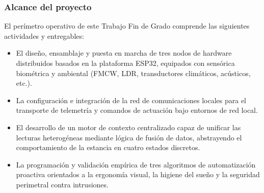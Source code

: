 \subsubsection{Alcance del proyecto}
El perímetro operativo de este Trabajo Fin de Grado comprende las siguientes actividades y entregables:
\begin{itemize}
    \item El diseño, ensamblaje y puesta en marcha de tres nodos de hardware distribuidos basados en la plataforma ESP32, equipados con sensórica biométrica y ambiental (FMCW, LDR, transductores climáticos, acústicos, etc.).
    \item La configuración e integración de la red de comunicaciones locales para el transporte de telemetría y comandos de actuación bajo entornos de red local.
    \item El desarrollo de un motor de contexto centralizado capaz de unificar las lecturas heterogéneas mediante lógica de fusión de datos, abstrayendo el comportamiento de la estancia en cuatro estados discretos.
    \item La programación y validación empírica de tres algoritmos de automatización proactiva orientados a la ergonomía visual, la higiene del sueño y la seguridad perimetral contra intrusiones.
\end{itemize}

